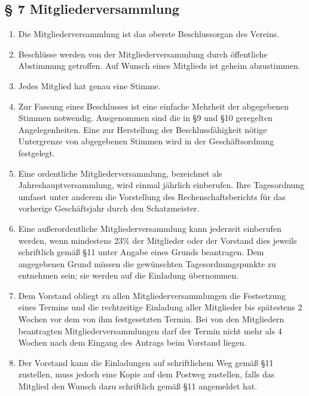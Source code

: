 ﻿\documentclass[10pt,a4paper]{scrartcl}
\begin{document}
\subsection*{§ 7 Mitgliederversammlung}
\begin{enumerate}

        \item Die Mitgliederversammlung ist das oberste Beschlussorgan des Vereins.
        \item Beschlüsse werden von der Mitgliederversammlung durch öffentliche Abstimmung getroffen.
                Auf Wunsch eines Mitglieds ist geheim abzustimmen.
        \item Jedes Mitglied hat genau eine Stimme.
        \item Zur Fassung eines Beschlusses ist eine einfache Mehrheit der abgegebenen Stimmen
                notwendig. Ausgenommen sind die in §9 und §10 geregelten Angelegenheiten. Eine
                zur Herstellung der Beschlussfähigkeit nötige Untergrenze von abgegebenen Stimmen
                wird in der Geschäftsordnung festgelegt.
        \item Eine ordentliche Mitgliederversammlung, bezeichnet als Jahreshauptversammlung,
                wird einmal jährlich einberufen. Ihre Tagesordnung umfasst unter anderem die
                Vorstellung des Rechenschaftsberichts für das vorherige Geschäftsjahr durch
                den Schatzmeister.
        \item Eine außerordentliche Mitgliederversammlung kann jederzeit einberufen werden, wenn
                mindestens 23\% der Mitglieder oder der Vorstand dies jeweils schriftlich gemäß §11
                unter Angabe eines Grunds beantragen. Dem angegebenen Grund müssen die gewünschten
                Tagesordnungspunkte zu entnehmen sein; sie werden auf die Einladung übernommen.
        \item Dem Vorstand obliegt zu allen Mitgliederversammlungen die Festsetzung eines Termins
                und die rechtzeitige Einladung aller Mitglieder bis spätestens 2 Wochen vor dem
                von ihm festgesetzten Termin. Bei von den Mitgliedern beantragten
                Mitgliederversammlungen darf der Termin nicht mehr als 4 Wochen nach dem Eingang
                des Antrags beim Vorstand liegen.
        \item Der Vorstand kann die Einladungen auf schriftlichem Weg gemäß §11 zustellen, muss
                jedoch eine Kopie auf dem Postweg zustellen, falls das Mitglied den Wunsch dazu
                schriftlich gemäß §11 angemeldet hat.

\end{enumerate}
\end{document}
